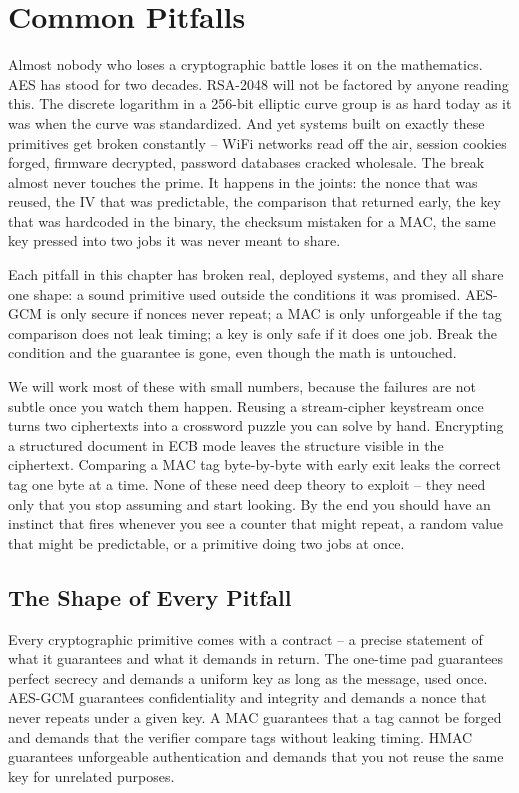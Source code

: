 \chapter{Common Pitfalls}

Almost nobody who loses a cryptographic battle loses it on the mathematics. AES has stood for two decades. RSA-2048 will not be factored by anyone reading this. The discrete logarithm in a 256-bit elliptic curve group is as hard today as it was when the curve was standardized. And yet systems built on exactly these primitives get broken constantly -- WiFi networks read off the air, session cookies forged, firmware decrypted, password databases cracked wholesale. The break almost never touches the prime. It happens in the joints: the nonce that was reused, the IV that was predictable, the comparison that returned early, the key that was hardcoded in the binary, the checksum mistaken for a MAC, the same key pressed into two jobs it was never meant to share.

Each pitfall in this chapter has broken real, deployed systems, and they all share one shape: a sound primitive used outside the conditions it was promised. AES-GCM is only secure if nonces never repeat; a MAC is only unforgeable if the tag comparison does not leak timing; a key is only safe if it does one job. Break the condition and the guarantee is gone, even though the math is untouched.

We will work most of these with small numbers, because the failures are not subtle once you watch them happen. Reusing a stream-cipher keystream once turns two ciphertexts into a crossword puzzle you can solve by hand. Encrypting a structured document in ECB mode leaves the structure visible in the ciphertext. Comparing a MAC tag byte-by-byte with early exit leaks the correct tag one byte at a time. None of these need deep theory to exploit -- they need only that you stop assuming and start looking. By the end you should have an instinct that fires whenever you see a counter that might repeat, a random value that might be predictable, or a primitive doing two jobs at once.

\chapterline

\section{The Shape of Every Pitfall}
\label{ch38:shape}

Every cryptographic primitive comes with a contract -- a precise statement of what it guarantees and what it demands in return. The one-time pad guarantees perfect secrecy and demands a uniform key as long as the message, used once. AES-GCM guarantees confidentiality and integrity and demands a nonce that never repeats under a given key. A MAC guarantees that a tag cannot be forged and demands that the verifier compare tags without leaking timing. HMAC guarantees unforgeable authentication and demands that you not reuse the same key for unrelated purposes.

